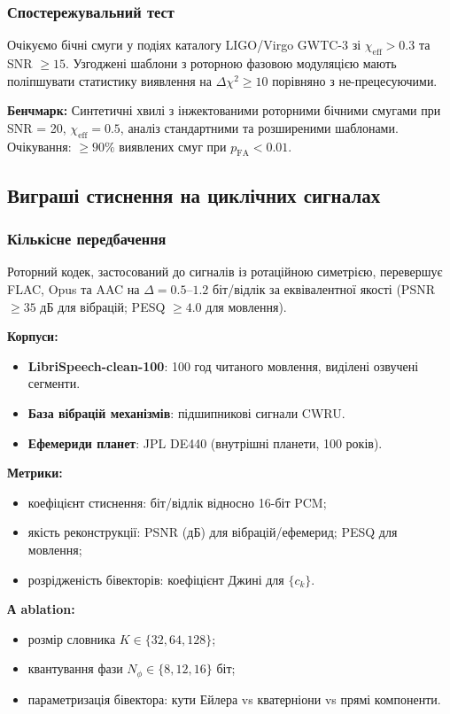 \documentclass[11pt,a4paper]{article}
\theoremstyle{definition}
\theoremstyle{plain}
\theoremstyle{remark}
\begin{document}
\subsubsection{Спостережувальний тест}

Очікуємо бічні смуги у подіях каталогу LIGO/Virgo GWTC-3 зі $\chi_{\text{eff}} > 0.3$ та SNR $\ge 15$. Узгоджені шаблони з роторною фазовою модуляцією мають поліпшувати статистику виявлення на $\Delta\chi^2 \ge 10$ порівняно з не-прецесуючими.

\textbf{Бенчмарк:} Синтетичні хвилі з інжектованими роторними бічними смугами при SNR = 20, $\chi_{\text{eff}} = 0.5$, аналіз стандартними та розширеними шаблонами. Очікування: $\ge 90\%$ виявлених смуг при $p_{\text{FA}} < 0.01$.

\subsection{Виграші стиснення на циклічних сигналах}

\subsubsection{Кількісне передбачення}

Роторний кодек, застосований до сигналів із ротаційною симетрією, перевершує FLAC, Opus та AAC на $\Delta = 0.5$–$1.2$ біт/відлік за еквівалентної якості (PSNR $\ge 35$ дБ для вібрацій; PESQ $\ge 4.0$ для мовлення).

\textbf{Корпуси:}
\begin{itemize}
  \item \textbf{LibriSpeech-clean-100}: 100 год читаного мовлення, виділені озвучені сегменти.
  \item \textbf{База вібрацій механізмів}: підшипникові сигнали CWRU.
  \item \textbf{Ефемериди планет}: JPL DE440 (внутрішні планети, 100 років).
\end{itemize}

\textbf{Метрики:}
\begin{itemize}
  \item коефіцієнт стиснення: біт/відлік відносно 16-біт PCM;
  \item якість реконструкції: PSNR (дБ) для вібрацій/ефемерид; PESQ для мовлення;
  \item розрідженість бівекторів: коефіцієнт Джині для $\{c_k\}$.
\end{itemize}

\textbf{А ablation:}
\begin{itemize}
  \item розмір словника $K \in \{32, 64, 128\}$;
  \item квантування фази $N_\phi \in \{8, 12, 16\}$ біт;
  \item параметризація бівектора: кути Ейлера vs кватерніони vs прямі компоненти.
\end{itemize}
\end{document}
